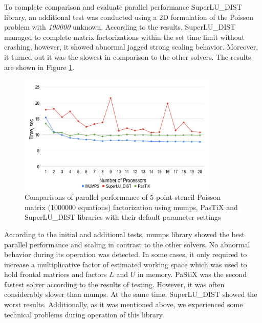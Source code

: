 
To complete comparison and evaluate parallel performance SuperLU\_DIST library, an additional test was conducted using a 2D formulation of the Poisson problem with \textit{100000} unknown. According to the results, SuperLU\_DIST managed to complete matrix factorizations within the set time limit without crashing, however, it showed abnormal jagged strong scaling behavior. Moreover, it turned out it was the slowest in comparison to the other solvers. The results are shown in Figure \ref{fig:5-point-stencil-solvers-comparison}.\\



\figpointer{\ref{fig:5-point-stencil-solvers-comparison}}
\begin{figure}[htpb]
  \centering
  \includegraphics[width=0.85\textwidth]{figures/chapter-2/solvers-comparison-5-point-stencil.png}
\caption{Comparisons of parallel performance of 5 point-stencil Poisson matrix (1000000  equations) factorization using 
\acrshort{mumps}, PasTiX and SuperLU\_DIST libraries with their default parameter settings}
\label{fig:5-point-stencil-solvers-comparison}
\end{figure}


According to the initial and additional tests, \acrshort{mumps} library showed the best parallel performance and scaling in contrast to the other solvers. No abnormal behavior during its operation was detected. In some cases, it only required to increase a multiplicative factor of estimated working space which was used to hold frontal matrices and factors $L$ and $U$ in memory. PaStiX was the second fastest solver according to the results of testing. However,  it was often considerably slower than \acrshort{mumps}. At the same time, SuperLU\_DIST showed the worst results. Additionally, as it was mentioned above, we experienced some technical problems during operation of this library.\\


